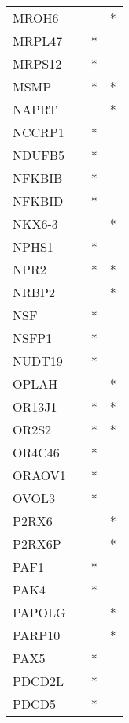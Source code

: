 \begin{longtable}{lccc}
MROH6        &           &     &       * \\
MRPL47       &           &   * &         \\
MRPS12       &           &   * &         \\
MSMP         &           &   * &       * \\
NAPRT        &           &     &       * \\
NCCRP1       &           &   * &         \\
NDUFB5       &           &   * &         \\
NFKBIB       &           &   * &         \\
NFKBID       &           &   * &         \\
NKX6-3       &           &     &       * \\
NPHS1        &           &   * &         \\
NPR2         &           &   * &       * \\
NRBP2        &           &     &       * \\
NSF          &           &   * &         \\
NSFP1        &           &   * &         \\
NUDT19       &           &   * &         \\
OPLAH        &           &     &       * \\
OR13J1       &           &   * &       * \\
OR2S2        &           &   * &       * \\
OR4C46       &           &   * &         \\
ORAOV1       &           &   * &         \\
OVOL3        &           &   * &         \\
P2RX6        &           &     &       * \\
P2RX6P       &           &     &       * \\
PAF1         &           &   * &         \\
PAK4         &           &   * &         \\
PAPOLG       &           &     &       * \\
PARP10       &           &     &       * \\
PAX5         &           &   * &         \\
PDCD2L       &           &   * &         \\
PDCD5        &           &   * &         \\

\end{longtable}
